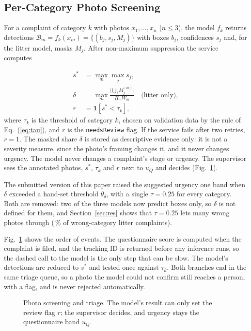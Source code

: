 \documentclass{ieeeaccess}
\begin{document}
\subsection{Per-Category Photo Screening}\label{sec:ai}

For a complaint of category $k$ with photos $x_1,\dots,x_n$ ($n\le3$), the model $f_k$ returns detections $\mathcal{B}_m=f_k(x_m)=\{(b_j,s_j,M_j)\}$ with boxes $b_j$, confidences $s_j$ and, for the litter model, masks $M_j$. After non-maximum suppression the service computes

\begin{align}
s^{*}&=\max_{m}\max_{j} s_j, \label{eq:sstar}\\
\delta&=\max_{m}\frac{\bigl|\bigcup_j M_j^{(m)}\bigr|}{H_m W_m}\quad\text{(litter only)}, \label{eq:delta}\\
r&=\mathbf{1}\left[s^{*}<\tau_k\right], \label{eq:flag}
\end{align}
\noindent where $\tau_k$ is the threshold of category $k$, chosen on validation data by the rule of Eq.~(\ref{eq:tau}), and $r$ is the \texttt{needsReview} flag. If the service fails after two retries, $r=1$. The masked share $\delta$ is stored as descriptive evidence only: it is not a severity measure, since the photo's framing changes it, and it never changes urgency. The model never changes a complaint's stage or urgency. The supervisor sees the annotated photos, $s^{*}$, $\tau_k$ and $r$ next to $u_Q$ and decides (Fig.~\ref{fig:f6}).

The submitted version of this paper raised the suggested urgency one band when $\delta$ exceeded a hand-set threshold $\theta_\delta$, with a single $\tau=0.25$ for every category. Both are removed: two of the three models now predict boxes only, so $\delta$ is not defined for them, and Section~\ref{sec:res} shows that $\tau=0.25$ lets many wrong photos through (\nLitterWrongTwentyfive\,\% of wrong-category litter complaints).

Fig.~\ref{fig:f6} shows the order of events. The questionnaire score is computed when the complaint is filed, and the tracking ID is returned before any inference runs, so the dashed call to the model is the only step that can be slow. The model's detections are reduced to $s^{*}$ and tested once against $\tau_k$. Both branches end in the same triage queue, so a photo the model could not confirm still reaches a person, with a flag, and is never rejected automatically.

\begin{figure}[!tb]
\centering
\resizebox{\columnwidth}{!}{}
\caption{Photo screening and triage. The model's result can only set the review flag $r$; the supervisor decides, and urgency stays the questionnaire band $u_Q$.}
\label{fig:f6}
\end{figure}
\end{document}
